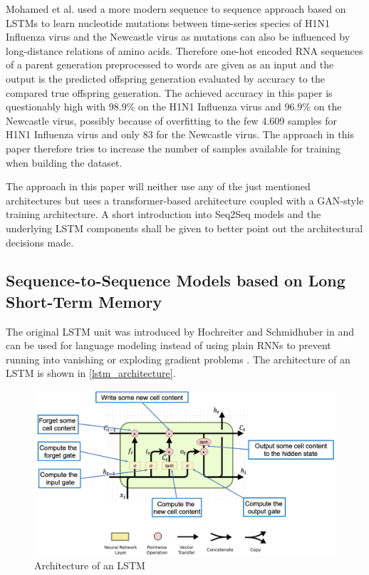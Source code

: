 Mohamed et al. \cite{Mohamed2021} used a more modern sequence to sequence approach based on \acp{LSTM} to learn nucleotide mutations between time-series species of H1N1 Influenza virus and the Newcastle virus as mutations can also be influenced by long-distance relations of amino acids. Therefore one-hot encoded \ac{RNA} sequences of a parent generation preprocessed to words are given as an input and the output is the predicted offspring generation evaluated by accuracy to the compared true offspring generation. The achie\-ved accuracy in this paper is questionably high with 98.9\% on the H1N1 Influenza virus and 96.9\% on the Newcastle virus, possibly because of over\-fit\-ting to the few 4.609 samples for H1N1 Influenza virus and only 83 for the Newcastle virus. The approach in this paper therefore tries to increase the number of samples available for training when building the dataset. 

\vspace{0.5cm}
The approach in this paper will neither use any of the just mentioned architectures but uses a transformer-based architecture coupled with a \ac{GAN}-style training architecture. A short introduction into \ac{Seq2Seq} models and the underlying \ac{LSTM} components shall be given to better point out the architectural decisions made. 

\subsection{Sequence-to-Sequence Models based on Long Short-Term Memory} \label{fundamentalsF}

The original \ac{LSTM} unit was introduced by Hochreiter and Schmidhuber in \cite{Hochreiter1997} and can be used for language modeling instead of using plain \acp{RNN} to prevent running into vanishing or exploding gradient problems \cite{Sundermeyer2012}. The architecture of an \ac{LSTM} is shown in \autoref{lstm_architecture}.

\begin{figure}[ht]
	\centering
	\includegraphics[width=\linewidth]{figures/lstm_architecture.png}
	\caption{Architecture of an \ac{LSTM} \cite{Gertz2020}}
	\label{lstm_architecture}
\end{figure}

